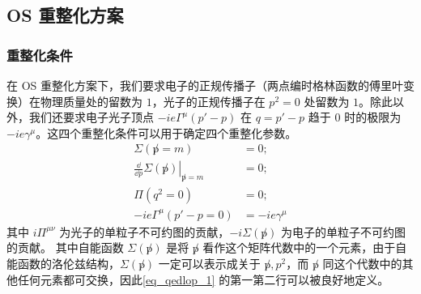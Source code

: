 \subsection{OS 重整化方案}
\subsubsection{重整化条件}
在 OS 重整化方案下，我们要求电子的正规传播子（两点编时格林函数的傅里叶变换）在物理质量处的留数为 $1$，光子的正规传播子在 $p^2=0$ 处留数为 $1$。除此以外，我们还要求电子光子顶点 $-ie\Gamma^\mu(p'-p)$ 在 $q=p'-p$ 趋于 $0$ 时的极限为 $-ie\gamma^\mu$。这四个重整化条件可以用于确定四个重整化参数。
\begin{equation}\label{eq_qedlop_1}
\begin{aligned}
\Sigma(\not p=m) &= 0;\\
\left.\frac{\dd }{\dd p}\Sigma(\not p)\right|_{\not p=m}&=0;\\
\Pi(q^2=0)&=0;\\
-ie\Gamma^\mu(p'-p=0)&=-ie\gamma^\mu
\end{aligned}
\end{equation}
其中 $i\Pi^{\mu\nu}$ 为光子的单粒子不可约图的贡献，$-i\Sigma(\not p)$ 为电子的单粒子不可约图的贡献。
其中自能函数 $\Sigma(\not p)$ 是将 $\not p$ 看作这个矩阵代数中的一个元素，由于自能函数的洛伦兹结构，$\Sigma(\not p)$ 一定可以表示成关于 $\not p, p^2$，而 $\not p$ 同这个代数中的其他任何元素都可交换，因此\autoref{eq_qedlop_1} 的第一第二行可以被良好地定义。
